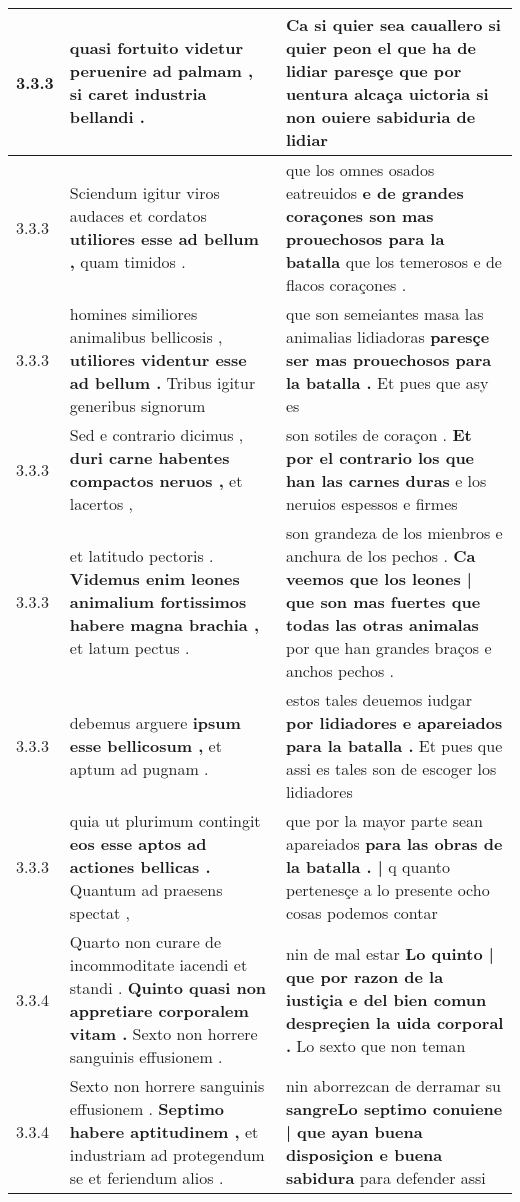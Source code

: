 \begin{tabular}{|p{1cm}|p{6.5cm}|p{6.5cm}|}
3.3.3 & quasi fortuito videtur \textbf{ peruenire ad palmam , } si caret industria bellandi . & Ca si quier sea cauallero si quier peon el que ha de lidiar paresçe \textbf{ que por uentura alcaça uictoria } si non ouiere sabiduria de lidiar \\\hline
3.3.3 & Sciendum igitur viros audaces et cordatos \textbf{ utiliores esse ad bellum , } quam timidos . & que los omnes osados eatreuidos \textbf{ e de grandes coraçones son mas prouechosos para la batalla } que los temerosos e de flacos coraçones . \\\hline
3.3.3 & homines similiores animalibus bellicosis , \textbf{ utiliores videntur esse ad bellum . } Tribus igitur generibus signorum & que son semeiantes masa las animalias lidiadoras \textbf{ paresçe ser mas prouechosos para la batalla . } Et pues que asy es \\\hline
3.3.3 & Sed e contrario dicimus , \textbf{ duri carne habentes compactos neruos , } et lacertos , & son sotiles de coraçon . \textbf{ Et por el contrario los que han las carnes duras } e los neruios espessos e firmes \\\hline
3.3.3 & et latitudo pectoris . \textbf{ Videmus enim leones animalium fortissimos habere magna brachia , } et latum pectus . & son grandeza de los mienbros e anchura de los pechos . \textbf{ Ca veemos que los leones | que son mas fuertes que todas las otras animalas } por que han grandes braços e anchos pechos . \\\hline
3.3.3 & debemus arguere \textbf{ ipsum esse bellicosum , } et aptum ad pugnam . & estos tales deuemos iudgar \textbf{ por lidiadores e apareiados para la batalla . } Et pues que assi es tales son de escoger los lidiadores \\\hline
3.3.3 & quia ut plurimum contingit \textbf{ eos esse aptos ad actiones bellicas . } Quantum ad praesens spectat , & que por la mayor parte sean apareiados \textbf{ para las obras de la batalla . |  } q quanto pertenesçe a lo presente ocho cosas podemos contar \\\hline
3.3.4 & Quarto non curare de incommoditate iacendi et standi . \textbf{ Quinto quasi non appretiare corporalem vitam . } Sexto non horrere sanguinis effusionem . & nin de mal estar \textbf{ Lo quinto | que por razon de la iustiçia e del bien comun despreçien la uida corporal . } Lo sexto que non teman \\\hline
3.3.4 & Sexto non horrere sanguinis effusionem . \textbf{ Septimo habere aptitudinem , } et industriam ad protegendum se et feriendum alios . & nin aborrezcan de derramar su \textbf{ sangreLo septimo conuiene | que ayan buena disposiçion e buena sabidura } para defender assi \\\hline

\end{tabular}
